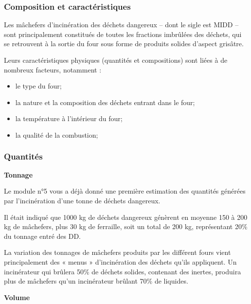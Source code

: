 \subsubsection{Composition et caractéristiques}

Les mâchefers d’incinération des déchets dangereux – dont le sigle est MIDD – sont principalement constitués de toutes les fractions imbrûlées des déchets, qui se retrouvent à la sortie du four sous forme de produits solides d’aspect grisâtre.
\vspace{0.3cm}

\newpage
Leurs caractéristiques physiques (quantités et compositions) sont liées à de nombreux facteurs, notamment : 

\begin{itemize}
\item le type du four;
\item  la nature et la composition des déchets entrant dans le four;
\item  la température à l’intérieur du four;
\item  la qualité de la combustion;

\end{itemize}

\subsubsection{Quantités}

\vspace{0.3cm}
\textbf{Tonnage}
\vspace{0.3cm} 

Le module n°5 vous a déjà donné une première estimation des quantités générées par l’incinération d’une tonne de déchets dangereux.
\vspace{0.3cm}

Il était indiqué que 1000 kg de déchets dangereux génèrent en moyenne 150 à 200 kg de mâchefers, plus 30 kg de ferraille, soit un total de 200 kg, représentant 20\% du tonnage entré des DD.
\vspace{0.3cm}

La variation des tonnages de mâchefers produits par les différent fours vient principalement des « menus » d’incinération des déchets qu’ils appliquent. Un incinérateur qui brûlera 50\% de déchets solides, contenant des inertes, produira plus de mâchefers qu’un incinérateur brûlant 70\% de liquides.


\vspace{0.3cm}
\textbf{Volume}
\vspace{0.3cm}

